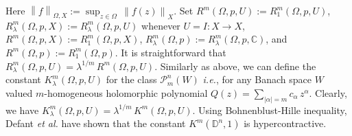\documentclass[a4paper,11pt, reqno]{amsart}
\theoremstyle{definition}
\newcounter {own}
\newcommand{\norm}[1]{\left\lVert#1\right\rVert}
\begin{document}
	\noindent Here $\norm{f}_{\Omega,X}:=\sup_{z \in \Omega}\,\norm{f(z)}_{X}$. Set $R^m(\Omega, p,U):=R^m_{1}(\Omega, p,U)$, $R^m_{\lambda}(\Omega, p,X):=R^m_{\lambda}(\Omega, p,U)$ whenever $U=I:X\rightarrow X$, $R^m(\Omega, p,X):=R^m_{1}(\Omega, p,X)$, $R^m_{\lambda}(\Omega, p):=R^m_{\lambda}(\Omega, p,\mathbb{C})$, and $R^m(\Omega,p):=R^m_1(\Omega,p)$. It is straightforward that $R^m_{\lambda}(\Omega, p,U)=\lambda^{1/m}\,R^m(\Omega, p,U)$. Similarly as above, we can define the constant $K^m_{\lambda}(\Omega, p,U)$ for the class $\mathcal{P}^n_m(W)$ {\it i.e.}, for any Banach space $W$ valued $m$-homogeneous holomorphic polynomial $Q(z)=\sum_{|\alpha|=m}c_{\alpha}\, z^{\alpha}$. Clearly, we have $K^m_{\lambda}(\Omega, p,U)=\lambda^{1/m}\,K^m(\Omega, p,U)$. Using Bohnenblust-Hille inequality, Defant {\it et al.} \cite{defant-2011} have shown that the constant $K^m(\mathbb{D}^n,1)$ is hypercontractive.
	\vspace{2mm}
	
\end{document}
